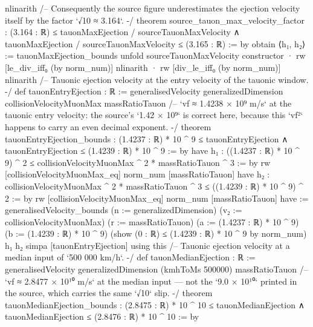 \documentclass[11pt,a4paper]{article}
\begin{document}
{    nlinarith
\mbox{}
/-- Consequently the source figure underestimates the ejection velocity itself by
the factor `√10 ≈ 3.164`. -/
theorem source\_\allowbreak{}tauon\_\allowbreak{}max\_\allowbreak{}velocity\_\allowbreak{}factor :
    (3.164 : ℝ) ≤ tauonMaxEjection / sourceTauonMaxVelocity ∧
      tauonMaxEjection / sourceTauonMaxVelocity ≤ (3.165 : ℝ) := by
  obtain ⟨h₁, h₂⟩ := tauonMaxEjection\_\allowbreak{}bounds
  unfold sourceTauonMaxVelocity
  constructor
  · rw [le\_\allowbreak{}div\_\allowbreak{}iff₀ (by norm\_\allowbreak{}num)]
    nlinarith
  · rw [div\_\allowbreak{}le\_\allowbreak{}iff₀ (by norm\_\allowbreak{}num)]
    nlinarith
\mbox{}
/-- Tauonic ejection velocity at the entry velocity of the tauonic window. -/
def tauonEntryEjection : ℝ :=
  generalisedVelocity generalizedDimension collisionVelocityMuonMax massRatioTauon
\mbox{}
/-- `vf ≈ 1.4238 × 10⁹ m/s` at the tauonic entry velocity: the source's
`1.42 × 10⁹` is correct here, because this `vf²` happens to carry an even
decimal exponent. -/
theorem tauonEntryEjection\_\allowbreak{}bounds :
    (1.4237 : ℝ) * 10 \textasciicircum{} 9 ≤ tauonEntryEjection ∧
      tauonEntryEjection ≤ (1.4239 : ℝ) * 10 \textasciicircum{} 9 := by
  have h₁ : ((1.4237 : ℝ) * 10 \textasciicircum{} 9) \textasciicircum{} 2 ≤
      collisionVelocityMuonMax \textasciicircum{} 2 * massRatioTauon \textasciicircum{} 3 := by
    rw [collisionVelocityMuonMax\_\allowbreak{}eq]
    norm\_\allowbreak{}num [massRatioTauon]
  have h₂ : collisionVelocityMuonMax \textasciicircum{} 2 * massRatioTauon \textasciicircum{} 3 ≤
      ((1.4239 : ℝ) * 10 \textasciicircum{} 9) \textasciicircum{} 2 := by
    rw [collisionVelocityMuonMax\_\allowbreak{}eq]
    norm\_\allowbreak{}num [massRatioTauon]
  have := generalisedVelocity\_\allowbreak{}bounds (n := generalizedDimension)
    (v₂ := collisionVelocityMuonMax) (r := massRatioTauon)
    (a := (1.4237 : ℝ) * 10 \textasciicircum{} 9) (b := (1.4239 : ℝ) * 10 \textasciicircum{} 9)
    (show (0 : ℝ) ≤ (1.4239 : ℝ) * 10 \textasciicircum{} 9 by norm\_\allowbreak{}num) h₁ h₂
  simpa [tauonEntryEjection] using this
\mbox{}
/-- Tauonic ejection velocity at a median input of `500 000 km/h`. -/
def tauonMedianEjection : ℝ :=
  generalisedVelocity generalizedDimension (kmhToMs 500000) massRatioTauon
\mbox{}
/-- `vf ≈ 2.8477 × 10¹⁰ m/s` at the median input — not the `9.0 × 10¹⁰` printed
in the source, which carries the same `√10` slip. -/
theorem tauonMedianEjection\_\allowbreak{}bounds :
    (2.8475 : ℝ) * 10 \textasciicircum{} 10 ≤ tauonMedianEjection ∧
      tauonMedianEjection ≤ (2.8476 : ℝ) * 10 \textasciicircum{} 10 := by
}
\end{document}
